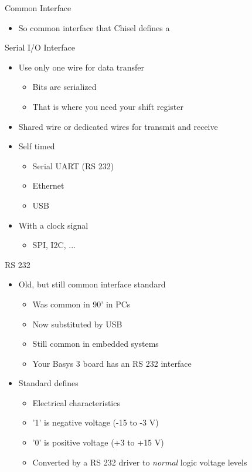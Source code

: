 \begin{frame}[fragile]{Common Interface}
\begin{itemize}
\item So common interface that Chisel defines a 
\end{itemize}
\end{frame}

\begin{frame}[fragile]{Serial I/O Interface}
\begin{itemize}
\item Use only one wire for data transfer
\begin{itemize}
\item Bits are serialized
\item That is where you need your shift register
\end{itemize}
\item Shared wire or dedicated wires for transmit and receive
\item Self timed
\begin{itemize}
\item Serial UART (RS 232)
\item Ethernet
\item USB
\end{itemize}
\item With a clock signal
\begin{itemize}
\item SPI, I2C, ...
\end{itemize}
\end{itemize}
\end{frame}



\begin{frame}[fragile]{RS 232}
\begin{itemize}
\item Old, but still common interface standard
\begin{itemize}
\item Was common in 90' in PCs
\item Now substituted by USB
\item Still common in embedded systems
\item Your Basys 3 board has an RS 232 interface
\end{itemize}
\item Standard defines
\begin{itemize}
\item Electrical characteristics
\item '1' is negative voltage (-15 to -3 V)
\item '0' is positive voltage (+3 to +15 V)
\item Converted by a RS 232 driver to \emph{normal} logic voltage levels
\end{itemize}
\end{itemize}
\end{frame}


